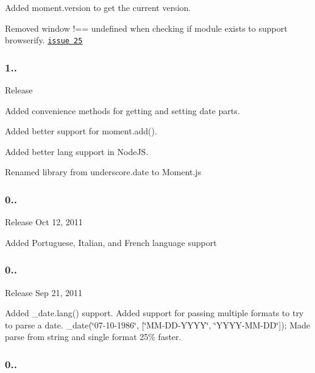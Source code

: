 Added {\ttfamily moment.\+version} to get the current version.

Removed {\ttfamily window !== undefined} when checking if module exists to support browserify. \href{https://github.com/timrwood/moment/pull/25}{\tt issue 25}

\subsubsection*{1..}


\begin{DoxyItemize}
\item Release
\end{DoxyItemize}

Added convenience methods for getting and setting date parts.

Added better support for {\ttfamily moment.\+add()}.

Added better lang support in Node\+JS.

Renamed library from underscore.\+date to Moment.\+js

\subsubsection*{0..}


\begin{DoxyItemize}
\item Release Oct 12, 2011
\end{DoxyItemize}

Added Portuguese, Italian, and French language support

\subsubsection*{0..}


\begin{DoxyItemize}
\item Release Sep 21, 2011
\end{DoxyItemize}

Added \+\_\+date.\+lang() support. Added support for passing multiple formats to try to parse a date. \+\_\+date(\char`\"{}07-\/10-\/1986\char`\"{}, \mbox{[}\char`\"{}\+M\+M-\/\+D\+D-\/\+Y\+Y\+Y\+Y\char`\"{}, \char`\"{}\+Y\+Y\+Y\+Y-\/\+M\+M-\/\+D\+D\char`\"{}\mbox{]}); Made parse from string and single format 25\% faster.

\subsubsection*{0..}


